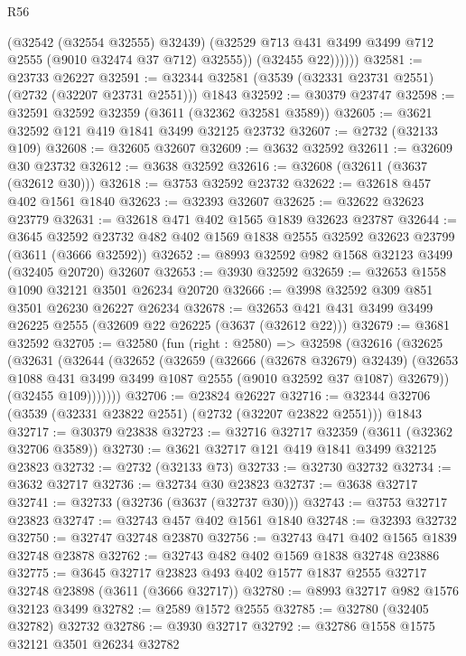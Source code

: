 \begin{lexlean}{R56}
\begin{coremodule}
                (@32542 (@32554 @32555) @32439)
                (@32529 @713 @431 @3499 @3499 @712 @2555 (@9010 @32474 @37 @712) @32555))
              (@32455 @22))))))
@32581 := @23733 @26227
@32591 := @32344 @32581 (@3539 (@32331 @23731 @2551) (@2732 (@32207 @23731 @2551))) @1843
@32592 := @30379 @23747
@32598 := @32591 @32592 @32359 (@3611 (@32362 @32581 @3589))
@32605 := @3621 @32592 @121 @419 @1841 @3499 @32125 @23732
@32607 := @2732 (@32133 @109)
@32608 := @32605 @32607
@32609 := @3632 @32592
@32611 := @32609 @30 @23732
@32612 := @3638 @32592
@32616 := @32608 (@32611 (@3637 (@32612 @30)))
@32618 := @3753 @32592 @23732
@32622 := @32618 @457 @402 @1561 @1840
@32623 := @32393 @32607
@32625 := @32622 @32623 @23779
@32631 := @32618 @471 @402 @1565 @1839 @32623 @23787
@32644 := @3645
    @32592
    @23732
    @482
    @402
    @1569
    @1838
    @2555
    @32592
    @32623
    @23799
    (@3611 (@3666 @32592))
@32652 := @8993 @32592 @982 @1568 @32123 @3499 (@32405 @20720) @32607
@32653 := @3930 @32592
@32659 := @32653 @1558 @1090 @32121 @3501 @26234 @20720
@32666 := @3998 @32592 @309 @851 @3501 @26230 @26227 @26234
@32678 := @32653 @421 @431 @3499 @3499 @26225 @2555 (@32609 @22 @26225 (@3637 (@32612 @22)))
@32679 := @3681 @32592
@32705 := @32580
    (fun (right : @2580) =>
    @32598
      (@32616
        (@32625
          (@32631
            (@32644
              (@32652
                (@32659
                  (@32666 (@32678 @32679) @32439)
                  (@32653 @1088 @431 @3499 @3499 @1087 @2555 (@9010 @32592 @37 @1087) @32679))
                (@32455 @109)))))))
@32706 := @23824 @26227
@32716 := @32344 @32706 (@3539 (@32331 @23822 @2551) (@2732 (@32207 @23822 @2551))) @1843
@32717 := @30379 @23838
@32723 := @32716 @32717 @32359 (@3611 (@32362 @32706 @3589))
@32730 := @3621 @32717 @121 @419 @1841 @3499 @32125 @23823
@32732 := @2732 (@32133 @73)
@32733 := @32730 @32732
@32734 := @3632 @32717
@32736 := @32734 @30 @23823
@32737 := @3638 @32717
@32741 := @32733 (@32736 (@3637 (@32737 @30)))
@32743 := @3753 @32717 @23823
@32747 := @32743 @457 @402 @1561 @1840
@32748 := @32393 @32732
@32750 := @32747 @32748 @23870
@32756 := @32743 @471 @402 @1565 @1839 @32748 @23878
@32762 := @32743 @482 @402 @1569 @1838 @32748 @23886
@32775 := @3645
    @32717
    @23823
    @493
    @402
    @1577
    @1837
    @2555
    @32717
    @32748
    @23898
    (@3611 (@3666 @32717))
@32780 := @8993 @32717 @982 @1576 @32123 @3499
@32782 := @2589 @1572 @2555
@32785 := @32780 (@32405 @32782) @32732
@32786 := @3930 @32717
@32792 := @32786 @1558 @1575 @32121 @3501 @26234 @32782

\end{coremodule}
\end{lexlean}
